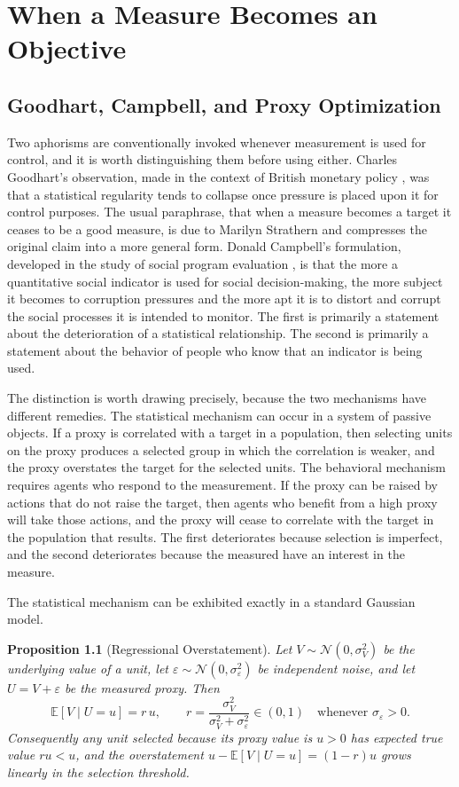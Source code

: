 \documentclass[11pt]{report}
\newtheorem{proposition}[theorem]{Proposition}
\theoremstyle{definition}
\theoremstyle{remark}
\newcommand{\EE}{\mathbb{E}}
\begin{document}
\chapter{When a Measure Becomes an Objective}

\section{Goodhart, Campbell, and Proxy Optimization}

Two aphorisms are conventionally invoked whenever measurement is used for control, and it is worth distinguishing them before using either. Charles Goodhart's observation, made in the context of British monetary policy \cite{goodhart}, was that a statistical regularity tends to collapse once pressure is placed upon it for control purposes. The usual paraphrase, that when a measure becomes a target it ceases to be a good measure, is due to Marilyn Strathern \cite{strathern} and compresses the original claim into a more general form. Donald Campbell's formulation, developed in the study of social program evaluation \cite{campbell}, is that the more a quantitative social indicator is used for social decision-making, the more subject it becomes to corruption pressures and the more apt it is to distort and corrupt the social processes it is intended to monitor. The first is primarily a statement about the deterioration of a statistical relationship. The second is primarily a statement about the behavior of people who know that an indicator is being used.

The distinction is worth drawing precisely, because the two mechanisms have different remedies. The statistical mechanism can occur in a system of passive objects. If a proxy is correlated with a target in a population, then selecting units on the proxy produces a selected group in which the correlation is weaker, and the proxy overstates the target for the selected units. The behavioral mechanism requires agents who respond to the measurement. If the proxy can be raised by actions that do not raise the target, then agents who benefit from a high proxy will take those actions, and the proxy will cease to correlate with the target in the population that results. The first deteriorates because selection is imperfect, and the second deteriorates because the measured have an interest in the measure.

The statistical mechanism can be exhibited exactly in a standard Gaussian model.

\begin{proposition}[Regressional Overstatement]\label{prop:regress}
Let $V\sim\mathcal N(0,\sigma_V^2)$ be the underlying value of a unit, let $\varepsilon\sim\mathcal N(0,\sigma_\varepsilon^2)$ be independent noise, and let $U=V+\varepsilon$ be the measured proxy. Then
\[
\EE[V\mid U=u]=r\,u,\qquad r=\frac{\sigma_V^2}{\sigma_V^2+\sigma_\varepsilon^2}\in(0,1)\quad\text{whenever }\sigma_\varepsilon>0 .
\]
Consequently any unit selected because its proxy value is $u>0$ has expected true value $ru<u$, and the overstatement $u-\EE[V\mid U=u]=(1-r)u$ grows linearly in the selection threshold.
\end{proposition}
\end{document}
